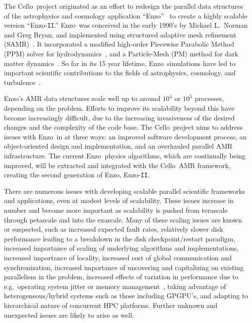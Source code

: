 \documentclass[11pt,letterpaper]{article}
\newcommand{\cello}{\textsf{Cello}}
\newcommand{\enzo}{\textsf{Enzo}}
\newcommand{\enzoii}{\textsf{Enzo}-\texttt{II}}
\begin{document}
The \cello\ project originated as an effort to redesign the parallel
data structures of the astrophysics and cosmology application
``\enzo''~\cite{OsBr04} to create a highly scalable version
``\enzoii.''  \enzo\ was conceived in the early 1990's by Michael
L.~Norman and Greg Bryan, and implemented using structured adaptive
mesh refinement (SAMR)~\cite{BeCo89}.  It incorporated a modified
high-order Piecewise Parabolic Method (PPM) solver for
hydrodynamics~\cite{WoCo84b}, and a Particle-Mesh (PM) method for dark
matter dynamics~\cite{HoEa88}.  So far in its 15 year lifetime, \enzo\
simulations have led to important scientific contributions to the
fields of astrophysics, cosmology, and
turbulence~\cite{@@@enzo-science}.

\enzo's AMR data structures scale well up to around $10^4$ or $10^5$
processes, depending on the problem.  Efforts to improve its
scalability beyond this have become increasingly difficult, due to the
increasing invasiveness of the desired changes and the complexity of
the code base.  The \cello\ project aims to address issues with \enzo\
in at three ways: an improved software development process, an
object-oriented design and implementation, and an overhauled parallel
AMR infrastructure.  The current \enzo\ physics algorithms, which are
continually being improved, will be extracted and integrated with the
\cello\ AMR framework, creating the second generation of \enzo,
\enzoii.

There are numerous issues with developing scalable parallel scientific
frameworks and applications, even at modest levels of scalability.
These issues increase in number and become more important as
scalability is pushed from terascale through petascale and into the
exascale.  Many of these scaling issues are known or suspected, such
as increased expected fault rates, relatively slower disk performance
leading to a breakdown in the disk checkpoint/restart paradigm,
increased importance of scaling of underlying algorithms and
implementations, increased importance of locality, increased cost of
global communication and synchronization, increased importance of
uncovering and capitalizing on existing parallelism in the problem,
increased effects of variation in performance due to e.g.~operating
system jitter or memory management~\cite{StSh09}, taking advantage of
heterogeneous/hybrid systems such as those including GPGPU's, and
adapting to hierarchical nature of concurrent HPC platforms.  Further
unknown and unexpected issues are likely to arise as well.
\end{document}
